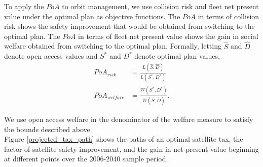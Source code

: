 \documentclass[12pt]{article}
\begin{document}
To apply the $PoA$ to orbit management, we use collision risk and fleet net present value under the optimal plan as objective functions. The $PoA$ in terms of collision risk shows the safety improvement that would be obtained from switching to the optimal plan. The $PoA$ in terms of fleet net present value shows the gain in social welfare obtained from switching to the optimal plan. Formally, letting $\hat{S}$ and $\hat{D}$ denote open access values and $S^*$ and $D^*$ denote optimal plan values,
\begin{align}
PoA_{risk} &= \frac{L(\hat{S},\hat{D})}{L(S^*,D^*)} \\
PoA_{welfare} &= \frac{W(S^*,D^*)}{W(\hat{S},\hat{D})}.
\end{align}

We use open access welfare in the denominator of the welfare measure to satisfy the bounds described above. \\


Figure \ref{projected_tax_path} shows the paths of an optimal satellite tax, the factor of satellite safety improvement, and the gain in net present value beginning at different points over the 2006-2040 sample period.
\end{document}
